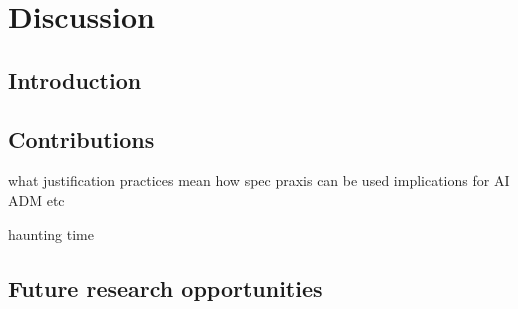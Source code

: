 \chapter{Discussion}
\label{}

\section{Introduction}
\label{sec:}






\section{Contributions}

what justification practices mean 
how spec praxis can be used
implications for AI ADM etc

haunting 
time




\section{Future research opportunities}